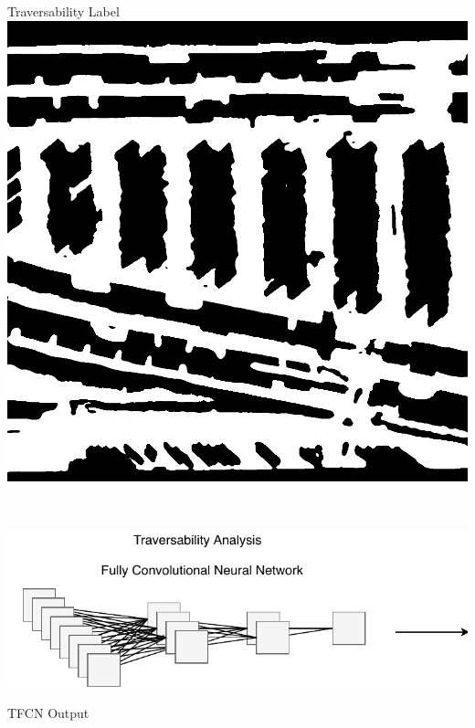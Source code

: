 \documentclass[usenames,dvipsnames,10pt]{beamer}
\begin{document}
\begin{frame}
\begin{minipage}[]{0.3\textwidth}
\end{minipage}
\hspace{0.25cm}
\begin{minipage}[]{0.3\textwidth}
	\centering
	Traversability Label
	\includegraphics[width=\textwidth]{graphics/aerial04-trav.jpg}
\end{minipage} \\
\vspace{0.25cm}
\begin{minipage}[]{0.666\textwidth}
	\includegraphics[width=\textwidth]{graphics/tfcn2.pdf}
\end{minipage}
\begin{minipage}[]{0.3\textwidth}
	\centering
	TFCN Output

\end{minipage}
\end{frame}
\end{document}
